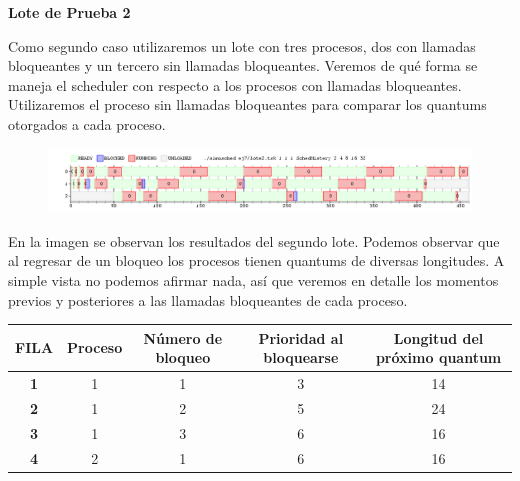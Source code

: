 \textbf{Lote de Prueba 2}
\\
\par Como segundo caso utilizaremos un lote con tres procesos, dos con llamadas bloqueantes y un tercero sin llamadas bloqueantes. Veremos de qué forma se maneja el scheduler con respecto a los procesos con llamadas bloqueantes. Utilizaremos el proceso sin llamadas bloqueantes para comparar los quantums otorgados a cada proceso.

\begin{figure}[h]
  \centering
    \includegraphics[width=1\textwidth]{images/ej7/lote2.png}
  \label{fig: lote7_2}
\end{figure}

\par En la imagen se observan los resultados del segundo lote. Podemos observar que al regresar de un bloqueo los procesos tienen quantums de diversas longitudes. A simple vista no podemos afirmar nada, así que veremos en detalle los momentos previos y posteriores a las llamadas bloqueantes de cada proceso.

\begin{center}
  \begin{tabular}{ | c | c | c | c | c | }
    \hline
    \textbf{FILA} & \textbf{Proceso} & \textbf{Número de bloqueo} & \textbf{Prioridad al bloquearse} & \textbf{Longitud del próximo quantum} \\ \hline
	\textbf{1} & 1 & 1 & 3 & 14 \\ \hline
  \textbf{2} & 1 & 2 & 5 & 24 \\ \hline
	\textbf{3} & 1 & 3 & 6 & 16 \\ \hline
	\textbf{4} & 2 & 1 & 6 & 16 \\ \hline
  \end{tabular}
\end{center}

